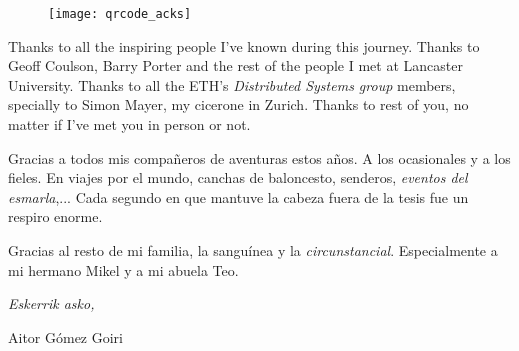 \begin{acknowledgements}
\begin{figure}[h]
    \centering
    \texttt{[image: qrcode\_acks]}
\end{figure}


Thanks to all the inspiring people I've known during this journey.
Thanks to Geoff Coulson, Barry Porter and the rest of the people I met at Lancaster University.
Thanks to all the ETH's \emph{Distributed Systems group} members, specially to Simon Mayer, my cicerone in Zurich.
Thanks to rest of you, no matter if I've met you in person or not.


Gracias a todos mis compañeros de aventuras estos años.
A los ocasionales y a los fieles.
En viajes por el mundo, canchas de baloncesto, senderos, \emph{eventos del esmarla},...
Cada segundo en que mantuve la cabeza fuera de la tesis fue un respiro enorme.


Gracias al resto de mi familia, la sanguínea y la \emph{circunstancial}.
Especialmente a mi hermano Mikel y a mi abuela Teo.


\begin{flushright}
\textit{Eskerrik asko,}

Aitor Gómez Goiri

\monthname \ \the\year



\end{flushright}

\begin{listing}[nolol]
  \scriptsize
  
  \label{lst:workmates_ack}
\end{listing}



\end{acknowledgements}



